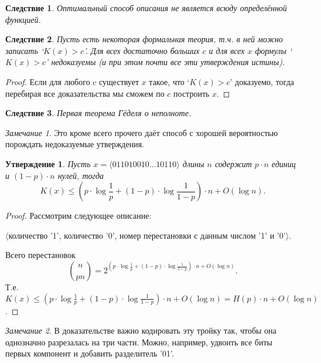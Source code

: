 \documentclass[12pt]{article}
\theoremstyle{definition}
\theoremstyle{plain}
\newtheorem{statement}{Утверждение}[section]
\newtheorem{corollary}{Следствие}[section]
\theoremstyle{remark}
\newtheorem{remark}{Замечание}[section]
\begin{document}
\begin{corollary}
    Оптимальный способ описания не является всюду определённой функцией.
\end{corollary}
\begin{corollary}
    Пусть есть некоторая формальная теория, т.ч. в ней можно записать
    `$K(x)>c$'. Для всех достаточно больших $c$ и для всех $x$ формулы
    `$K(x)>c$' недоказуемы (и при этом почти все эти утверждения истины).
\end{corollary}
\begin{proof}
    Если для любого $c$ существует $x$ такое, что `$K(x)>c$' доказуемо,
    тогда перебирая все доказательства мы сможем по $c$ построить $x$.
\end{proof}
\begin{corollary}
    Первая теорема Гёделя о неполноте.
\end{corollary}
\begin{remark}
    Это кроме всего прочего даёт способ с хорошей вероятностью порождать недоказуемые
    утверждения.
\end{remark}

\begin{statement}\label{st:kologorov:entropy}
Пусть $x = \langle{011010010\dotso 10110}\rangle$ длины $n$ содержит
$p\cdot n$ единиц и $(1-p)\cdot n$ нулей, тогда 
\[
    K(x)\le \left(p\cdot\log\frac1p + (1-p)\cdot\log\frac{1}{1-p}\right)\cdot n
        + O(\log n).
\]
\end{statement}
\begin{proof}
    Рассмотрим следующее описание:
    \begin{center}
    $\langle$количество '1', количество '0', номер перестановки с данным числом '1' и '0'$\rangle$.
    \end{center}
Всего перестановок 
    \[
        \binom{n}{pn} = 2^{\left(p\cdot\log\frac1p +
        (1-p)\cdot\log\frac{1}{1-p}\right)\cdot n + O(\log n)}.
    \]
    Т.е. $K(x)\le \left(p\cdot\log\frac1p +
        (1-p)\cdot\log\frac{1}{1-p}\right)\cdot n + O(\log n) = H(p)\cdot n + O(\log n)$.
\end{proof}
\begin{remark}
    В доказательстве важно кодировать эту тройку так, чтобы она однозначно
    разрезалась на три части. Можно, например, удвоить все биты первых
    компонент и добавить разделитель '01'.
\end{remark}
\end{document}
